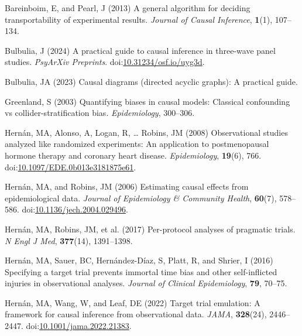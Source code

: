 \documentclass[
  single column]{article}
\newlength{\cslhangindent}
\newenvironment{CSLReferences}[2] %
 {\begin{list}{}{%
  \setlength{\itemindent}{0pt}
  \setlength{\leftmargin}{0pt}
  \setlength{\parsep}{0pt}
  \ifodd #1
   \setlength{\leftmargin}{\cslhangindent}
   \setlength{\itemindent}{-1\cslhangindent}
  \fi
  \setlength{\itemsep}{#2\baselineskip}}}
 {\end{list}}
\begin{document}
\label{refs}
\begin{CSLReferences}{1}{0}
Bareinboim, E, and Pearl, J (2013) A general algorithm for deciding
transportability of experimental results. \emph{Journal of Causal
Inference}, \textbf{1}(1), 107--134.

Bulbulia, J (2024) A practical guide to causal inference in three-wave
panel studies. \emph{PsyArXiv Preprints}.
doi:\href{https://doi.org/10.31234/osf.io/uyg3d}{10.31234/osf.io/uyg3d}.

Bulbulia, JA (2023) Causal diagrams (directed acyclic graphs): A
practical guide.

Greenland, S (2003) Quantifying biases in causal models: Classical
confounding vs collider-stratification bias. \emph{Epidemiology},
300--306.

Hernán, MA, Alonso, A, Logan, R, \ldots{} Robins, JM (2008)
Observational studies analyzed like randomized experiments: An
application to postmenopausal hormone therapy and coronary heart
disease. \emph{Epidemiology}, \textbf{19}(6), 766.
doi:\href{https://doi.org/10.1097/EDE.0b013e3181875e61}{10.1097/EDE.0b013e3181875e61}.

Hernán, MA, and Robins, JM (2006) Estimating causal effects from
epidemiological data. \emph{Journal of Epidemiology \& Community
Health}, \textbf{60}(7), 578--586.
doi:\href{https://doi.org/10.1136/jech.2004.029496}{10.1136/jech.2004.029496}.

Hernán, MA, Robins, JM, et al. (2017) Per-protocol analyses of pragmatic
trials. \emph{N Engl J Med}, \textbf{377}(14), 1391--1398.

Hernán, MA, Sauer, BC, Hernández-Díaz, S, Platt, R, and Shrier, I (2016)
Specifying a target trial prevents immortal time bias and other
self-inflicted injuries in observational analyses. \emph{Journal of
Clinical Epidemiology}, \textbf{79}, 70--75.

Hernán, MA, Wang, W, and Leaf, DE (2022) Target trial emulation: A
framework for causal inference from observational data. \emph{JAMA},
\textbf{328}(24), 2446--2447.
doi:\href{https://doi.org/10.1001/jama.2022.21383}{10.1001/jama.2022.21383}.


\end{CSLReferences}
\end{document}
